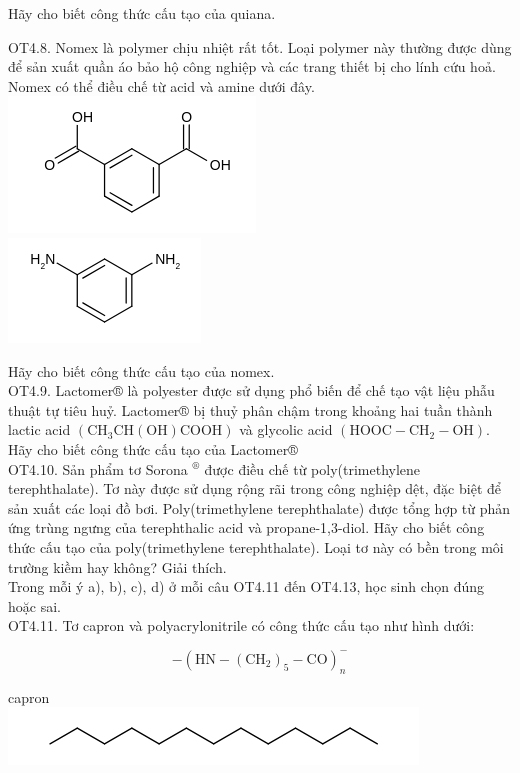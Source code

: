 \documentclass[10pt]{article}
\begin{document}
Hãy cho biết công thức cấu tạo của quiana.

OT4.8. Nomex là polymer chịu nhiệt rất tốt. Loại polymer này thường được dùng để sản xuất quần áo bảo hộ công nghiệp và các trang thiết bị cho lính cứu hoả. Nomex có thể điều chế từ acid và amine dưới đây.\\
\includegraphics{smile-befd06648c761d7120992a95120f7db7ab205d34}\\
\includegraphics{smile-42347c6f2c4e79f9dff777431aabb82989d10796}

Hãy cho biết công thức cấu tạo của nomex.\\
OT4.9. Lactomer® là polyester được sử dụng phổ biến để chế tạo vật liệu phẫu thuật tự tiêu huỷ. Lactomer® bị thuỷ phân chậm trong khoảng hai tuần thành lactic acid $\left(\mathrm{CH}_{3} \mathrm{CH}(\mathrm{OH}) \mathrm{COOH}\right)$ và glycolic acid $\left(\mathrm{HOOC}-\mathrm{CH}_{2}-\mathrm{OH}\right)$. Hãy cho biết công thức cấu tạo của Lactomer®\\
OT4.10. Sản phẩm tơ Sorona ${ }^{\circledR}$ được điều chế từ poly(trimethylene terephthalate). Tơ này được sử dụng rộng rãi trong công nghiệp dệt, đặc biệt để sản xuất các loại đồ bơi. Poly(trimethylene terephthalate) được tổng hợp từ phản ứng trùng ngưng của terephthalic acid và propane-1,3-diol. Hãy cho biết công thức cấu tạo của poly(trimethylene terephthalate). Loại tơ này có bền trong môi trường kiềm hay không? Giải thích.\\
Trong mỗi ý a), b), c), d) ở mỗi câu OT4.11 đến OT4.13, học sinh chọn đúng hoặc sai.\\
OT4.11. Tơ capron và polyacrylonitrile có công thức cấu tạo như hình dưới:

$$
-\left(\mathrm{HN}-\left(\mathrm{CH}_{2}\right)_{5}-\mathrm{CO}\right)_{n}^{-}
$$

capron\\
\includegraphics{smile-ad7c5aea5c67f6e6dfbf0b3c6f54701939d4a42b}
\end{document}
